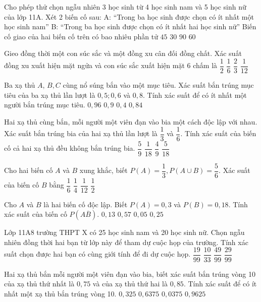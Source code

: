 \begin{ex}
Cho phép thử chọn ngẫu nhiên 3 học sinh từ 4 học sinh nam và 5 học sinh nữ của lớp 11A. Xét 2 biến cố sau:
A: “Trong ba học sinh được chọn có ít nhất một học sinh nam”
B: “Trong ba học sinh được chọn có ít nhất hai học sinh nữ”
Biến cố giao của hai biến cố trên có bao nhiêu phần tử
\choice
{$45$}
{\True $30$}
{$90$}
{$60$}
\end{ex}
\begin{ex}
Gieo đồng thời một con súc sắc và một đồng xu cân đối đồng chất. Xác suất đồng xu xuất hiện mặt ngửa và con súc sắc xuất hiện mặt $6$ chấm là
\choice
{$\dfrac{1}{2}$}
{$\dfrac{1}{6}$}
{$\dfrac{2}{3}$}
{\True $\dfrac{1}{12}$}
\end{ex}
\begin{ex}
Ba xạ thủ $A$, $B,C$ cùng nổ súng bắn vào một mục tiêu. Xác suất bắn trúng mục tiêu của ba xạ thủ lần lượt là $0{,}5 ;0{,}6$ và $0{,}8$. Tính xác suất để có ít nhất một người bắn trúng mục tiêu.
\choice
{\True $0{,}96$}
{$0{,}9$}
{$0{,}4$}
{$0{,}84$}
\end{ex}
\begin{ex}
Hai xạ thủ cùng bắn, mỗi người một viên đạn vào bia một cách độc lập với nhau.
Xác suất bắn trúng bia của hai xạ thủ lần lượt là $\dfrac{1}{3}$ và $\dfrac{1}{6}$. Tính xác suất của biến cố cả hai
xạ thủ đều không bắn trúng bia.
\choice
{\True $\dfrac{5}{9}$}
{$\dfrac{1}{18}$}
{$\dfrac{4}{9}$}
{$\dfrac{5}{18}$}
\end{ex}
\begin{ex}
Cho hai biến cố $A$ và $B$ xung khắc, biết $P(A)=\dfrac{1}{3},P\left(A\cup B\right)=\dfrac{5}{6}$. Xác suất của biến cố $B$ bằng
\choice
{$\dfrac{1}{6}$}
{$\dfrac{1}{4}$}
{$\dfrac{1}{12}$}
{\True $\dfrac{1}{2}$}
\end{ex}
\begin{ex}
Cho ${A}$ và ${B}$ là hai biến cố độc lập. Biết $P(A)=0{,}3$ và $P(B)=0{,}18$. Tính xác suất của biến cố $P\left(A\overline{{B}}\right)$.
\choice
{${0{,}13}$}
{${0{,}57}$}
{${0{,}05}$}
{\True ${0{,}25}$}
\end{ex}
\begin{ex}
Lớp 11A8 trường THPT X có 25 học sinh nam và 20 học sinh nữ. Chọn ngẫu nhiên đồng thời hai bạn từ lớp này để tham dự cuộc họp của trường. Tính xác suất chọn được hai bạn có cùng giới tính để đi dự cuộc họp.
\choice
{$\dfrac{19}{99}$}
{$\dfrac{10}{33}$}
{\True $\dfrac{49}{99}$}
{$\dfrac{29}{99}$}
\end{ex}
\begin{ex}
Hai xạ thủ bắn mỗi người một viên đạn vào bia, biết xác suất bắn trúng vòng 10 của xạ thủ thứ nhất là $0{,}75$ và của xạ thủ thứ hai là $0{,}85$. Tính xác suất để có ít nhất một xạ thủ bắn trúng vòng 10.
\choice
{$0{,}325$}
{$0{,}6375$}
{$0{,}0375$}
{\True $0{,}9625$}
\end{ex}
